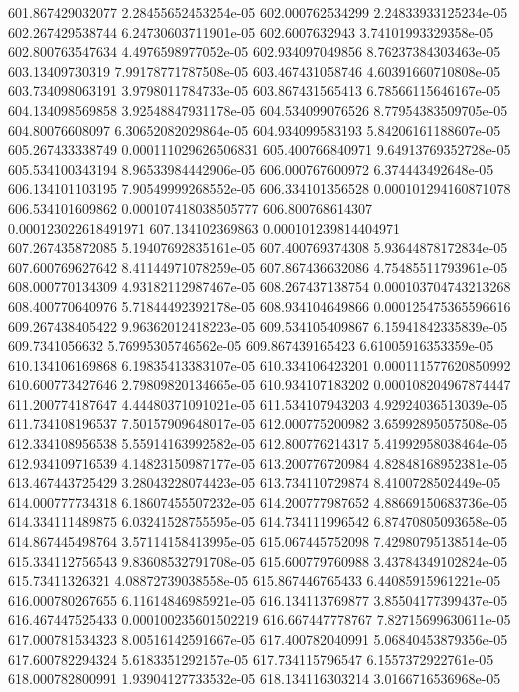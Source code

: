 {601.867429032077 2.28455652453254e-05
602.000762534299 2.24833933125234e-05
602.267429538744 6.24730603711901e-05
602.6007632943 3.74101993329358e-05
602.800763547634 4.4976598977052e-05
602.934097049856 8.76237384303463e-05
603.13409730319 7.99178771787508e-05
603.467431058746 4.60391660710808e-05
603.734098063191 3.9798011784733e-05
603.867431565413 6.78566115646167e-05
604.134098569858 3.92548847931178e-05
604.534099076526 8.77954383509705e-05
604.80076608097 6.30652082029864e-05
604.934099583193 5.84206161188607e-05
605.267433338749 0.000111029626506831
605.400766840971 9.64913769352728e-05
605.534100343194 8.96533984442906e-05
606.000767600972 6.374443492648e-05
606.134101103195 7.90549999268552e-05
606.334101356528 0.000101294160871078
606.534101609862 0.000107418038505777
606.800768614307 0.000123022618491971
607.134102369863 0.000101239814404971
607.267435872085 5.19407692835161e-05
607.400769374308 5.93644878172834e-05
607.600769627642 8.41144971078259e-05
607.867436632086 4.75485511793961e-05
608.000770134309 4.93182112987467e-05
608.267437138754 0.000103704743213268
608.400770640976 5.71844492392178e-05
608.934104649866 0.000125475365596616
609.267438405422 9.96362012418223e-05
609.534105409867 6.15941842335839e-05
609.7341056632 5.76995305746562e-05
609.867439165423 6.61005916353359e-05
610.134106169868 6.19835413383107e-05
610.334106423201 0.000111577620850992
610.600773427646 2.79809820134665e-05
610.934107183202 0.000108204967874447
611.200774187647 4.44480371091021e-05
611.534107943203 4.92924036513039e-05
611.734108196537 7.50157909648017e-05
612.000775200982 3.65992895057508e-05
612.334108956538 5.55914163992582e-05
612.800776214317 5.41992958038464e-05
612.934109716539 4.14823150987177e-05
613.200776720984 4.82848168952381e-05
613.467443725429 3.28043228074423e-05
613.734110729874 8.4100728502449e-05
614.000777734318 6.18607455507232e-05
614.200777987652 4.88669150683736e-05
614.334111489875 6.03241528755595e-05
614.734111996542 6.87470805093658e-05
614.867445498764 3.57114158413995e-05
615.067445752098 7.42980795138514e-05
615.334112756543 9.83608532791708e-05
615.600779760988 3.43784349102824e-05
615.73411326321 4.08872739038558e-05
615.867446765433 6.44085915961221e-05
616.000780267655 6.11614846985921e-05
616.134113769877 3.85504177399437e-05
616.467447525433 0.000100235601502219
616.667447778767 7.82715699630611e-05
617.000781534323 8.00516142591667e-05
617.400782040991 5.06840453879356e-05
617.600782294324 5.6183351292157e-05
617.734115796547 6.1557372922761e-05
618.000782800991 1.93904127733532e-05
618.134116303214 3.0166716536968e-05
}
